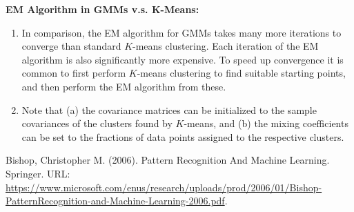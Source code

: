 \documentclass[11pt]{article}
\theoremstyle{plain} %
\newenvironment{topic}
{\color{C2}\normalfont\begin{framed}\begingroup }
  {\endgroup\end{framed}}
\theoremstyle{remark}
\newenvironment{remark}
  {\pushQED{\qed}\renewcommand{\qedsymbol}{$\triangle$}\remarkx}
  {\popQED\endremarkx}
\begin{document}
\begin{topic}
\textbf{EM Algorithm in GMMs v.s. K-Means:}
\begin{remark}\hfill
  \begin{enumerate}
    \item In comparison, the EM algorithm for GMMs takes many more iterations to
          converge than standard $K$-means clustering. Each iteration of the EM
          algorithm is also significantly more expensive. To speed up convergence it is
          common to first perform $K$-means clustering to find suitable starting points,
          and then perform the EM algorithm from these.

    \item Note that (a) the covariance matrices can be initialized to the sample
          covariances of the clusters found by $K$-means, and (b) the mixing
          coefficients can be set to the fractions of data points assigned to the
          respective clusters.
  \end{enumerate}
\end{remark}
\end{topic}

\begin{thebibliography}{1}

  Bishop, Christopher M. (2006). Pattern
  Recognition And Machine Learning. Springer. URL:
  \href{https://www.microsoft.com/enus/research/uploads/prod/2006/01/Bishop-PatternRecognition-and-Machine-Learning-2006.pdf}{https://www.microsoft.com/enus/research/uploads/prod/2006/01/Bishop-PatternRecognition-and-Machine-Learning-2006.pdf}.


\end{thebibliography}
\end{document}
